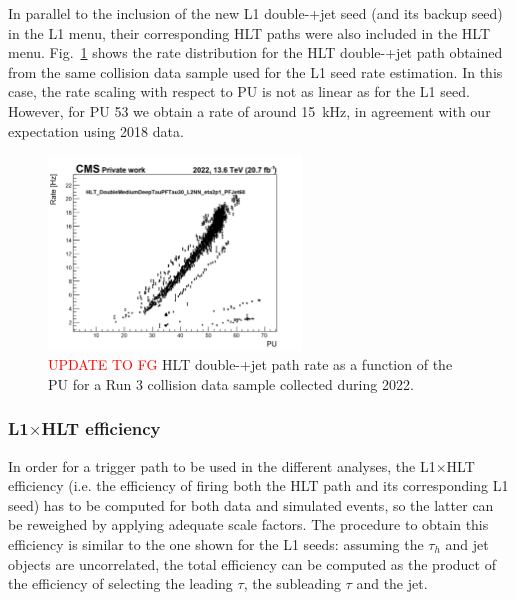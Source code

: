 \documentclass[../main.tex]{subfiles}
\begin{document}
In parallel to the inclusion of the new L1 double-\tauh{}+jet seed (and its backup seed) in the L1 menu, their corresponding HLT paths were also included in the HLT menu. Fig.~\ref{hh:fig:hlt_rate_run3} shows the rate distribution for the HLT double-\tauh{}+jet path obtained from the same collision data sample used for the L1 seed rate estimation. In this case, the rate scaling with respect to PU is not as linear as for the L1 seed. However, for PU 53 we obtain a rate of around 15~kHz, in agreement with our expectation using 2018 data.

\begin{figure}[h!]
\begin{center}
\includegraphics[width=0.6\textwidth]{Images/HLT_rate}
\end{center}
\caption{\textcolor{red}{UPDATE TO FG} HLT double-\tauh{}+jet path rate as a function of the PU for a Run 3 collision data sample collected during 2022.}
\label{hh:fig:hlt_rate_run3}
\end{figure}

\subsubsection{L1$\times$HLT efficiency}

In order for a trigger path to be used in the different analyses, the L1$\times$HLT efficiency (i.e. the efficiency of firing both the HLT path and its corresponding L1 seed) has to be computed for both data and simulated events, so the latter can be reweighed by applying adequate scale factors. The procedure to obtain this efficiency is similar to the one shown for the L1 seeds: assuming the $\tau_h$ and jet objects are uncorrelated, the total efficiency can be computed as the product of the efficiency of selecting the leading $\tau$, the subleading $\tau$ and the jet.
\end{document}
